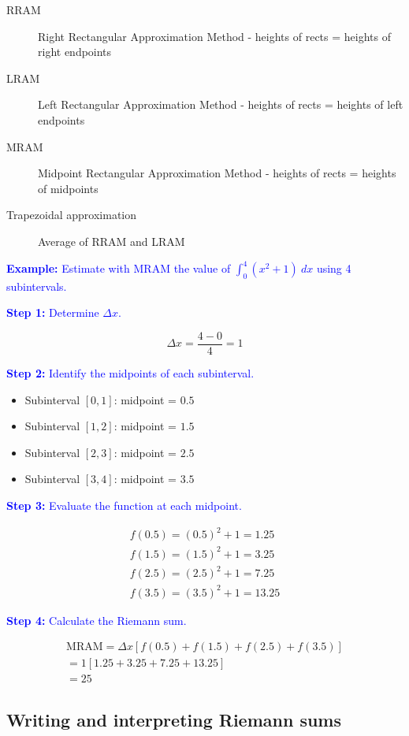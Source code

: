 \documentclass[letterpaper, 12pt]{article}
\newcommand{\example}[1]{\textcolor{blue}{\textbf{Example:} #1}}
\newcommand{\step}[2]{\textcolor{blue}{\textbf{Step #1:} #2}}
\begin{document}
\begin{description}
\item [RRAM] Right Rectangular Approximation Method - heights of rects = heights of right endpoints
\item [LRAM] Left Rectangular Approximation Method - heights of rects = heights of left endpoints
\item [MRAM] Midpoint Rectangular Approximation Method - heights of rects = heights of midpoints
\item [Trapezoidal approximation] Average of RRAM and LRAM
\end{description}

\example{Estimate with MRAM the value of $\displaystyle \int_{0}^{4} (x^2 + 1) \: dx$ using 4 subintervals.}

\step{1}{Determine $\Delta x$.}

$$\Delta x = \frac{4 - 0}{4} = 1$$

\step{2}{Identify the midpoints of each subinterval.}

\begin{itemize}
\item Subinterval $[0, 1]$: midpoint = $0.5$
\item Subinterval $[1, 2]$: midpoint = $1.5$
\item Subinterval $[2, 3]$: midpoint = $2.5$
\item Subinterval $[3, 4]$: midpoint = $3.5$
\end{itemize}

\step{3}{Evaluate the function at each midpoint.}

\begin{gather*}
f(0.5) = (0.5)^2 + 1 = 1.25 \\
f(1.5) = (1.5)^2 + 1 = 3.25 \\
f(2.5) = (2.5)^2 + 1 = 7.25 \\
f(3.5) = (3.5)^2 + 1 = 13.25
\end{gather*}

\step{4}{Calculate the Riemann sum.}

\begin{gather*}
\text{MRAM} = \Delta x [f(0.5) + f(1.5) + f(2.5) + f(3.5)] \\
= 1 [1.25 + 3.25 + 7.25 + 13.25] \\
= \boxed{25}
\end{gather*}

\subsection*{Writing and interpreting Riemann sums}
\end{document}
